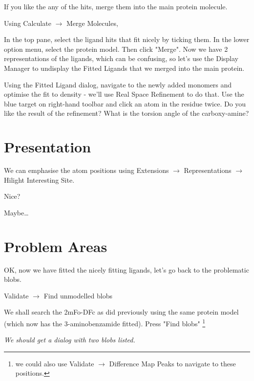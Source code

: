 \documentclass{article}
\begin{document}
\begin{trivlist}
\item If you like the any of the hits, merge them into the main
  protein molecule.

Using \textsf{Calculate $\rightarrow$ Merge Molecules}, 

\end{trivlist}

 In the top pane, select the ligand hits that fit nicely by ticking
 them.  In the lower option menu, select the protein model.  Then
 click "Merge".  Now we have 2 representations of the ligands, which
 can be confusing, so let's use the Display Manager to undisplay the
 Fitted Ligands that we merged into the main protein.

 Using the Fitted Ligand dialog, navigate to the newly added monomers
 and optimise the fit to density - we'll use Real Space Refinement to
 do that.  Use the blue target on right-hand toolbar and click an atom
 in the residue twice.  Do you like the result of the refinement?
 What is the torsion angle of the carboxy-amine?

\section{Presentation}

 We can emphasise the atom positions using 
 \textsf{Extensions $\rightarrow$ Representations $\rightarrow$ Hilight Interesting Site}.

 \begin{trivlist}
 \item Nice?

 \textsf{Maybe\ldots}
 \end{trivlist}

\section{Problem Areas}

OK, now we have fitted the nicely fitting ligands, let's go back to
the problematic blobs.

 \textsf{Validate $\rightarrow$ Find unmodelled blobs}

 We shall search the 2mFo-DFc as did previously using the same protein
 model (which now has the 3-aminobenzamide fitted).
 Press "Find blobs" \footnote{we could also use \textsf{Validate $\rightarrow$ Difference Map
   Peaks} to navigate to these positions.}

\textsl{ We should get a dialog with two blobs listed.}
 
\end{document}
